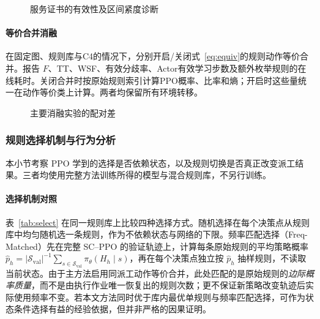 \begin{figure}[t]
 \centering
 \caption{服务证书的有效性及区间紧度诊断}\label{fig:cert}
\end{figure}

\paragraph{等价合并消融} 在固定图、规则库与C4的情况下，分别开启/关闭式~\eqref{eq:equiv}的规则动作等价合并。报告 $F$、TT、WSF、有效分歧率、Actor有效学习步数及额外枚举规则的在线耗时。关闭合并时按原始规则索引计算PPO概率、比率和熵；开启时这些量统一在动作等价类上计算。两者均保留所有环境转移。

\begin{figure}[t]
  \centering
  \caption{主要消融实验的配对差}\label{fig:abl}
\end{figure}


\subsubsection{规则选择机制与行为分析}

本小节考察 PPO 学到的选择是否依赖状态，以及规则切换是否真正改变派工结果。三者均使用完整方法训练所得的模型与混合规则库，不另行训练。

\paragraph{选择机制对照} 表~\ref{tab:select} 在同一规则库上比较四种选择方式。随机选择在每个决策点从规则库中均匀随机选一条规则，作为不依赖状态与网络的下限。频率匹配选择（Freq-Matched）先在完整 SC--PPO 的验证轨迹上，计算每条原始规则的平均策略概率 $\widehat p_h=|\mathcal S_{\mathrm{val}}|^{-1}\sum_{s\in\mathcal S_{\mathrm{val}}}\pi_\theta(H_h\mid s)$，再在每个决策点独立按 $\widehat p_h$ 抽样规则，不读取当前状态。由于主方法启用同派工动作等价合并，此处匹配的是原始规则的\emph{边际概率质量}，而不是由执行作业唯一恢复出的规则次数；更不保证新策略改变轨迹后实际使用频率不变。若本文方法同时优于库内最优单规则与频率匹配选择，可作为状态条件选择有益的经验依据，但并非严格的因果证明。

